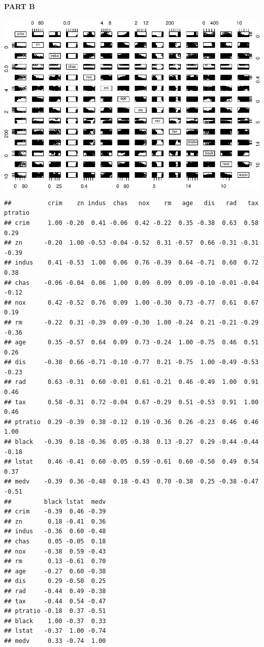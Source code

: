 \documentclass[
]{article}
\begin{document}
\hypertarget{part-b}{%
\paragraph{PART B}\label{part-b}}

\begin{center}\includegraphics{Disha_Gandhi_Take_Home_Exam_PDF_files/figure-latex/unnamed-chunk-2-1} \end{center}

\begin{verbatim}
##          crim    zn indus  chas   nox    rm   age   dis   rad   tax ptratio
## crim     1.00 -0.20  0.41 -0.06  0.42 -0.22  0.35 -0.38  0.63  0.58    0.29
## zn      -0.20  1.00 -0.53 -0.04 -0.52  0.31 -0.57  0.66 -0.31 -0.31   -0.39
## indus    0.41 -0.53  1.00  0.06  0.76 -0.39  0.64 -0.71  0.60  0.72    0.38
## chas    -0.06 -0.04  0.06  1.00  0.09  0.09  0.09 -0.10 -0.01 -0.04   -0.12
## nox      0.42 -0.52  0.76  0.09  1.00 -0.30  0.73 -0.77  0.61  0.67    0.19
## rm      -0.22  0.31 -0.39  0.09 -0.30  1.00 -0.24  0.21 -0.21 -0.29   -0.36
## age      0.35 -0.57  0.64  0.09  0.73 -0.24  1.00 -0.75  0.46  0.51    0.26
## dis     -0.38  0.66 -0.71 -0.10 -0.77  0.21 -0.75  1.00 -0.49 -0.53   -0.23
## rad      0.63 -0.31  0.60 -0.01  0.61 -0.21  0.46 -0.49  1.00  0.91    0.46
## tax      0.58 -0.31  0.72 -0.04  0.67 -0.29  0.51 -0.53  0.91  1.00    0.46
## ptratio  0.29 -0.39  0.38 -0.12  0.19 -0.36  0.26 -0.23  0.46  0.46    1.00
## black   -0.39  0.18 -0.36  0.05 -0.38  0.13 -0.27  0.29 -0.44 -0.44   -0.18
## lstat    0.46 -0.41  0.60 -0.05  0.59 -0.61  0.60 -0.50  0.49  0.54    0.37
## medv    -0.39  0.36 -0.48  0.18 -0.43  0.70 -0.38  0.25 -0.38 -0.47   -0.51
##         black lstat  medv
## crim    -0.39  0.46 -0.39
## zn       0.18 -0.41  0.36
## indus   -0.36  0.60 -0.48
## chas     0.05 -0.05  0.18
## nox     -0.38  0.59 -0.43
## rm       0.13 -0.61  0.70
## age     -0.27  0.60 -0.38
## dis      0.29 -0.50  0.25
## rad     -0.44  0.49 -0.38
## tax     -0.44  0.54 -0.47
## ptratio -0.18  0.37 -0.51
## black    1.00 -0.37  0.33
## lstat   -0.37  1.00 -0.74
## medv     0.33 -0.74  1.00
\end{verbatim}
\end{document}
